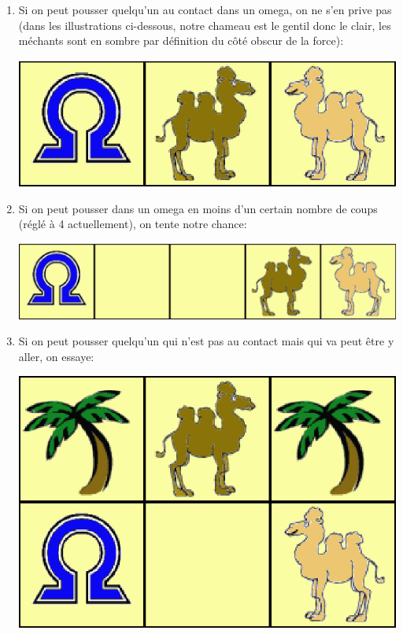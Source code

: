 \documentclass[a4paper,12pt]{article}
\begin{document}
\begin{enumerate}
\item Si on peut pousser quelqu'un au contact dans un omega, on ne s'en prive pas (dans les illustrations ci-dessous, notre chameau est le gentil donc le clair, les m\'echants sont en sombre par d\'efinition du c\^ot\'e obscur de la force):
\begin{center}
\includegraphics[scale=0.3]{./graph001.eps}
\end{center}
\item Si on peut pousser dans un omega en moins d'un certain nombre de coups (r\'egl\'e \`a 4 actuellement), on tente notre chance:
\begin{center}
\includegraphics[scale=0.3]{./graph002.eps}
\end{center}
\item Si on peut pousser quelqu'un qui n'est pas au contact mais qui va peut \^etre y aller, on essaye:
\begin{center}
\includegraphics[scale=0.3]{./graph003.eps}

\end{center}
\end{enumerate}
\end{document}
